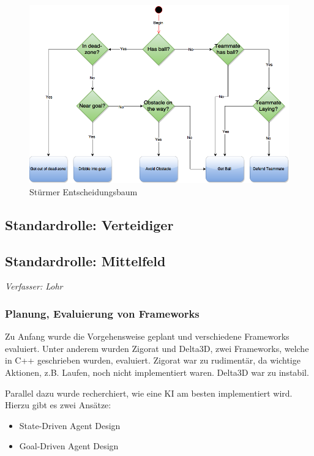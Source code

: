 \documentclass[fontsize=12pt,a4paper,final]{scrartcl}[2003/01/01]
\makeatletter
\def\ScaleIfNeeded{%
	\ifdim\Gin@nat@width>\linewidth
		\linewidth
	\else
		\Gin@nat@width
	\fi
}
\makeatother
\begin{document}
\begin{figure}[H]
	\centering
	\includegraphics[width=\ScaleIfNeeded]{Grafiken/KI/attackerCenter_v2}
	\caption{Stürmer Entscheidungsbaum}
	\label{Stürmer Entscheidungsbaum}
\end{figure}

\subsection{Standardrolle: Verteidiger}


\subsection{Standardrolle: Mittelfeld}
\textit{Verfasser: Lohr}\\
\subsubsection{Planung, Evaluierung von Frameworks}
Zu Anfang wurde die Vorgehensweise geplant und verschiedene Frameworks evaluiert. Unter anderem wurden Zigorat und Delta3D, zwei Frameworks, welche in C++ geschrieben wurden, evaluiert. Zigorat war zu rudimentär, da wichtige Aktionen, z.B. Laufen, noch nicht implementiert waren. Delta3D war zu instabil. \par
Parallel dazu wurde recherchiert, wie eine KI am besten implementiert wird. Hierzu gibt es zwei Ansätze:
\begin{itemize}
 \item State-Driven Agent Design
 \item Goal-Driven Agent Design
\end{itemize}
\end{document}
